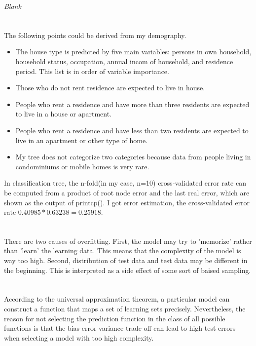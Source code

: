 \documentclass[11pt,a4paper]{article}
\begin{document}
\emph{Blank}

\section{}

The following points could be derived from my demography.
\begin{itemize}
\item The house type is predicted by five main variables: persons in own household, household status, occupation, annual incom of household, and residence period. This list is in order of variable importance.
\item Those who do not rent residence are expected to live in house.
\item People who rent a residence and have more than three residents are expected to live in a house or apartment.
\item People who rent a residence and have less than two residents are expected to live in an apartment or other type of home.
\item My tree does not categorize two categories because data from people living in condominiums or mobile homes is very rare.
\end{itemize}
In classification tree, the n-fold(in my case, n=10) cross-validated error rate can be computed from a product of root node error and the last real error, which are shown as the output of printcp(). I got error estimation, the cross-validated error rate \(0.40985*0.63238 = 0.25918\).

\section{}

There are two causes of overfitting. First, the model may try to 'memorize' rather than 'learn' the learning data. This means that the complexity of the model is way too high. Second, distribution of test data and test data may be different in the beginning. This is interpreted as a side effect of some sort of baised sampling.

\section{}

According to the universal approximation theorem, a particular model can construct a function that maps a set of learning sets precisely. Nevertheless, the reason for not selecting the prediction function in the class of all possible functions is that the bias-error variance trade-off can lead to high test errors when selecting a model with too high complexity.
\end{document}
